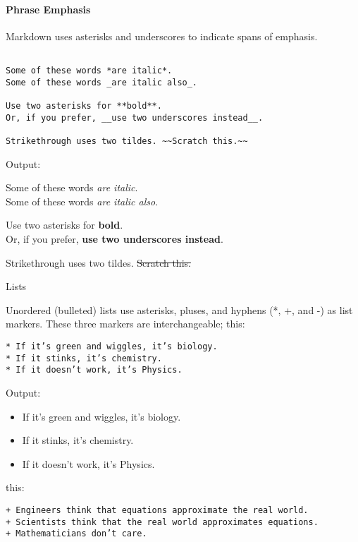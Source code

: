 \documentclass[
]{article}
\providecommand{\tightlist}{%
  \setlength{\itemsep}{0pt}\setlength{\parskip}{0pt}}
\begin{document}
\hypertarget{phrase-emphasis}{%
\paragraph{Phrase Emphasis}\label{phrase-emphasis}}

Markdown uses asterisks and underscores to indicate spans of emphasis.

\begin{verbatim}

Some of these words *are italic*.
Some of these words _are italic also_.

Use two asterisks for **bold**.
Or, if you prefer, __use two underscores instead__.

Strikethrough uses two tildes. ~~Scratch this.~~
\end{verbatim}

Output:

Some of these words \emph{are italic}.\\
Some of these words \emph{are italic also}.

Use two asterisks for \textbf{bold}.\\
Or, if you prefer, \textbf{use two underscores instead}.

Strikethrough uses two tildes. \sout{Scratch this.}

Lists

Unordered (bulleted) lists use asterisks, pluses, and hyphens (*, +, and
-) as list markers. These three markers are interchangeable; this:

\begin{verbatim}
* If it’s green and wiggles, it’s biology.
* If it stinks, it’s chemistry.
* If it doesn’t work, it’s Physics.
\end{verbatim}

Output:

\begin{itemize}
\tightlist
\item
  If it's green and wiggles, it's biology.
\item
  If it stinks, it's chemistry.
\item
  If it doesn't work, it's Physics.
\end{itemize}

this:

\begin{verbatim}
+ Engineers think that equations approximate the real world.
+ Scientists think that the real world approximates equations.
+ Mathematicians don’t care.
\end{verbatim}
\end{document}
